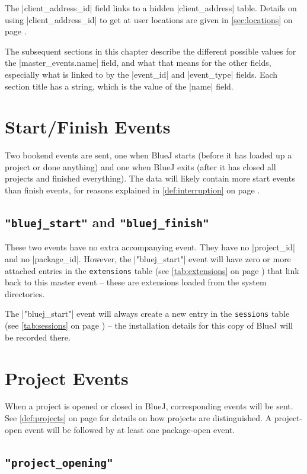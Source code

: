 \documentclass{report}
\newcommand{\myref}[1]{\autoref{#1} on page \pageref*{#1}}
\newcommand{\tabref}[1]{\lstinline|#1| table (see \myref{tab:#1})}
\begin{document}

The |client_address_id| field links to a hidden |client_address| table.  Details
on using |client_address_id| to get at user locations are given in \myref{sec:locations}.


The subsequent sections in this chapter describe the different possible values for the
|master_events.name| field, and what that means for the other fields,
especially what is linked to by the |event_id| and |event_type| fields.  Each
section title has a string, which is the value of the |name| field.

\section{Start/Finish Events}

Two bookend events are sent, one when BlueJ starts (before it has loaded up a
project or done anything) and one when BlueJ exits (after it has closed all
projects and finished everything).  The data will likely contain more start
events than finish events, for reasons explained in \myref{def:interruption}.

\subsection{\lstinline!"bluej_start"! and \lstinline!"bluej_finish"!}

These two events have no extra accompanying event.  They have no |project_id|
and no |package_id|.  However, the |"bluej_start"| event will have zero or more
attached entries in the \tabref{extensions} that link back to this master
event -- these are extensions loaded from the system directories.

The |"bluej_start"| event will always create a new entry in the
\tabref{sessions} -- the installation details for this copy of BlueJ will be
recorded there.

\section{Project Events}

When a project is opened or closed in BlueJ, corresponding events will be
sent.  See \myref{def:projects} for details on how projects are
distinguished.  A project-open event will be followed by at least one
package-open event.

\subsection{\lstinline!"project_opening"!}
\end{document}
